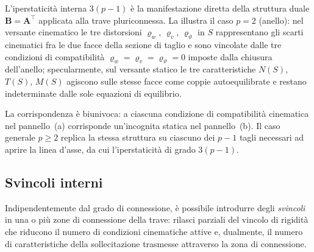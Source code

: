\begin{oss}
	L'iperstaticità interna $3(p-1)$ è la manifestazione
	diretta della struttura duale $\bm{B} = \bm{A}^{\top}$
	applicata alla trave pluriconnessa. La
	 illustra il caso
	$p = 2$ (anello): nel versante cinematico le tre
	distorsioni $\varrho_w$, $\varrho_v$,
	$\varrho_\vartheta$ in $S$ rappresentano gli scarti
	cinematici fra le due facce della sezione di taglio
	e sono vincolate dalle tre condizioni di compatibilità
	$\varrho_w = \varrho_v = \varrho_\vartheta = 0$
	imposte dalla chiusura dell'anello; specularmente,
	sul versante statico le tre caratteristiche $N(S)$,
	$T(S)$, $M(S)$ agiscono sulle stesse facce come
	coppie autoequilibrate e restano indeterminate dalle
	sole equazioni di equilibrio.
	



	
	La corrispondenza è biunivoca: a ciascuna condizione
	di compatibilità cinematica nel pannello~(a)
	corrisponde un'incognita statica nel pannello~(b).
	Il caso generale $p \geq 2$ replica la stessa
	struttura su ciascuno dei $p-1$ tagli necessari ad
	aprire la linea d'asse, da cui l'iperstaticità di
	grado $3(p-1)$.
\end{oss}



\subsection{Svincoli interni}
\label{sec:svincoli_interni}

Indipendentemente dal grado di connessione, è possibile
introdurre degli \emph{svincoli} in una o più zone di
connessione della trave: rilasci parziali del vincolo
di rigidità che riducono il numero di condizioni
cinematiche attive e, dualmente, il numero di
caratteristiche della sollecitazione trasmesse
attraverso la zona di connessione.


